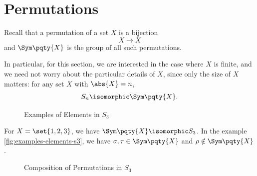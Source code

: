 \section{Permutations}
\label{sec:permutations}

Recall that a permutation of a set \(X\) is a bijection
\[
    X \to X
\]
and \(\Sym\pqty{X}\) is the group of all such permutations.

In particular, for this section, we are interested in the case where \(X\) is finite, and we need not worry about the particular details of \(X\), since only the size of \(X\) matters: for any set \(X\) with \(\abs{X} = n\),
\[
    S_n \isomorphic \Sym\pqty{X}.
\]

\begin{figure}[ht!]
    \centering
    \caption{Examples of Elements in \(S_3\)}
    \label{fig:examples-elements-s3}
\end{figure}

\begin{example*}
    For \(X = \set{1, 2, 3}\), we have \(\Sym\pqty{X} \isomorphic S_3\). In the example \autoref{fig:examples-elements-s3}, we have \(\sigma, \tau \in \Sym\pqty{X}\) and \(\rho \notin \Sym\pqty{X}\).
\end{example*}

\begin{figure}[ht!]
    \centering
    \caption{Composition of Permutations in \(S_3\)}
    \label{fig:composition-of-permutations-s3}
\end{figure}

